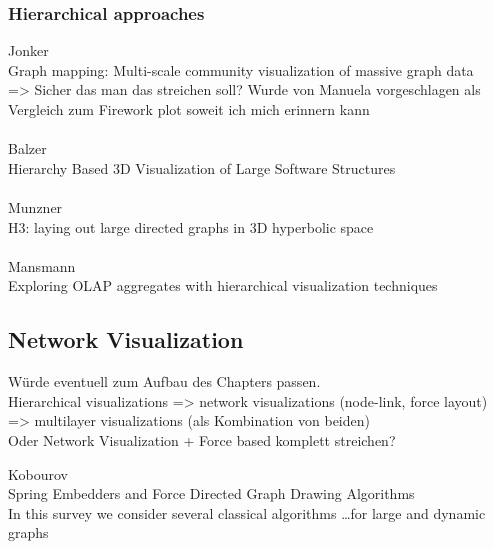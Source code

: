 \subsubsection{Hierarchical approaches}
Jonker\\
Graph mapping: Multi-scale community visualization of massive graph data\\
=> Sicher das man das streichen soll? Wurde von Manuela vorgeschlagen als Vergleich zum Firework plot soweit ich mich erinnern kann\\
\\
Balzer\\
Hierarchy Based 3D Visualization of Large Software Structures\\
\\
Munzner\\
H3: laying out large directed graphs in 3D hyperbolic space\\
\\
Mansmann\\
Exploring OLAP aggregates with hierarchical visualization techniques

\subsection{Network Visualization}
Würde eventuell zum Aufbau des Chapters passen. \\
Hierarchical visualizations => network visualizations (node-link, force layout) => multilayer visualizations (als Kombination von beiden)\\
Oder Network Visualization + Force based komplett streichen?

Kobourov\\
Spring Embedders and Force Directed Graph Drawing Algorithms\\
In this survey we consider several classical algorithms \dots for large and dynamic graphs
